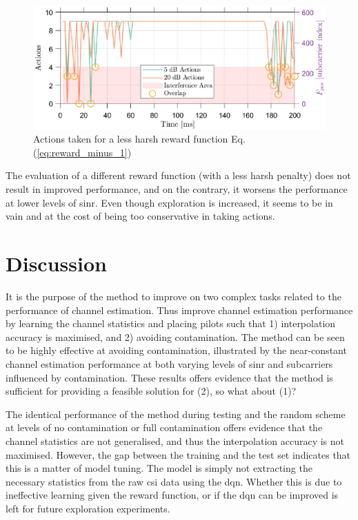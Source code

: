 \begin{figure}
    \centering
    \includegraphics{chapters/part_uplink/figures/results/rewardadjustsment_-1/action_timeseries.eps}
    \caption{Actions taken for a less harsh reward function Eq. (\ref{eq:reward_minus_1})}
    \label{fig:RL_different_reward_-1_actions}
\end{figure}

The evaluation of a different reward function (with a less harsh penalty) does not result in improved performance, and on the contrary, it worsens the performance at lower levels of \gls{sinr}. Even though exploration is increased, it seems to be in vain and at the cost of being too conservative in taking actions.


\section{Discussion}
It is the purpose of the method to improve on two complex tasks related to the performance of channel estimation. Thus improve channel estimation performance by learning the channel statistics and placing pilots such that 1) interpolation accuracy is maximised, and 2) avoiding contamination. The method can be seen to be highly effective at avoiding contamination, illustrated by the near-constant channel estimation performance at both varying levels of \gls{sinr} and subcarriers influenced by contamination. These results offers evidence that the method is sufficient for providing a feasible solution for (2), so what about (1)? 

The identical performance of the method during testing and the random scheme at levels of no contamination or full contamination offers evidence that the channel statistics are not generalised, and thus the interpolation accuracy is not maximised. However, the gap between the training and the test set indicates that this is a matter of model tuning. The model is simply not extracting the necessary statistics from the raw \gls{csi} data using the \gls{dqn}. Whether this is due to ineffective learning given the reward function, or if the \gls{dqn} can be improved is left for future exploration experiments.

